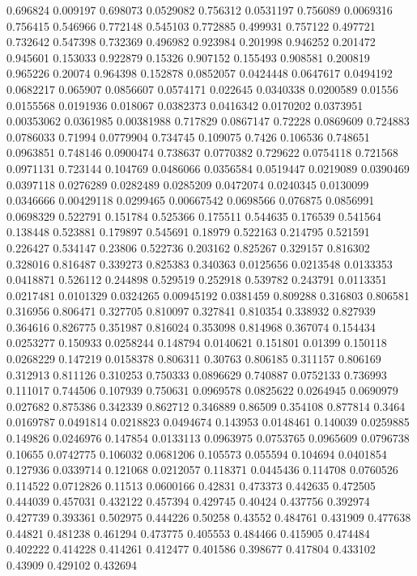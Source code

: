 0.696824 0.009197
0.698073 0.0529082
0.756312 0.0531197
0.756089 0.0069316
0.756415 0.546966
0.772148 0.545103
0.772885 0.499931
0.757122 0.497721
0.732642 0.547398
0.732369 0.496982
0.923984 0.201998
0.946252 0.201472
0.945601 0.153033
0.922879 0.15326
0.907152 0.155493
0.908581 0.200819
0.965226 0.20074
0.964398 0.152878
0.0852057 0.0424448
0.0647617 0.0494192
0.0682217 0.065907
0.0856607 0.0574171
0.022645 0.0340338
0.0200589 0.01556
0.0155568 0.0191936
0.018067 0.0382373
0.0416342 0.0170202
0.0373951 0.00353062
0.0361985 0.00381988
0.717829 0.0867147
0.72228 0.0869609
0.724883 0.0786033
0.71994 0.0779904
0.734745 0.109075
0.7426 0.106536
0.748651 0.0963851
0.748146 0.0900474
0.738637 0.0770382
0.729622 0.0754118
0.721568 0.0971131
0.723144 0.104769
0.0486066 0.0356584
0.0519447 0.0219089
0.0390469 0.0397118
0.0276289 0.0282489
0.0285209 0.0472074
0.0240345 0.0130099
0.0346666 0.00429118
0.0299465 0.00667542
0.0698566 0.076875
0.0856991 0.0698329
0.522791 0.151784
0.525366 0.175511
0.544635 0.176539
0.541564 0.138448
0.523881 0.179897
0.545691 0.18979
0.522163 0.214795
0.521591 0.226427
0.534147 0.23806
0.522736 0.203162
0.825267 0.329157
0.816302 0.328016
0.816487 0.339273
0.825383 0.340363
0.0125656 0.0213548
0.0133353 0.0418871
0.526112 0.244898
0.529519 0.252918
0.539782 0.243791
0.0113351 0.0217481
0.0101329 0.0324265
0.00945192 0.0381459
0.809288 0.316803
0.806581 0.316956
0.806471 0.327705
0.810097 0.327841
0.810354 0.338932
0.827939 0.364616
0.826775 0.351987
0.816024 0.353098
0.814968 0.367074
0.154434 0.0253277
0.150933 0.0258244
0.148794 0.0140621
0.151801 0.01399
0.150118 0.0268229
0.147219 0.0158378
0.806311 0.30763
0.806185 0.311157
0.806169 0.312913
0.811126 0.310253
0.750333 0.0896629
0.740887 0.0752133
0.736993 0.111017
0.744506 0.107939
0.750631 0.0969578
0.0825622 0.0264945
0.0690979 0.027682
0.875386 0.342339
0.862712 0.346889
0.86509 0.354108
0.877814 0.3464
0.0169787 0.0491814
0.0218823 0.0494674
0.143953 0.0148461
0.140039 0.0259885
0.149826 0.0246976
0.147854 0.0133113
0.0963975 0.0753765
0.0965609 0.0796738
0.10655 0.0742775
0.106032 0.0681206
0.105573 0.055594
0.104694 0.0401854
0.127936 0.0339714
0.121068 0.0212057
0.118371 0.0445436
0.114708 0.0760526
0.114522 0.0712826
0.11513 0.0600166
0.42831 0.473373
0.442635 0.472505
0.444039 0.457031
0.432122 0.457394
0.429745 0.40424
0.437756 0.392974
0.427739 0.393361
0.502975 0.444226
0.50258 0.43552
0.484761 0.431909
0.477638 0.44821
0.481238 0.461294
0.473775 0.405553
0.484466 0.415905
0.474484 0.402222
0.414228 0.414261
0.412477 0.401586
0.398677 0.417804
0.433102 0.43909
0.429102 0.432694
